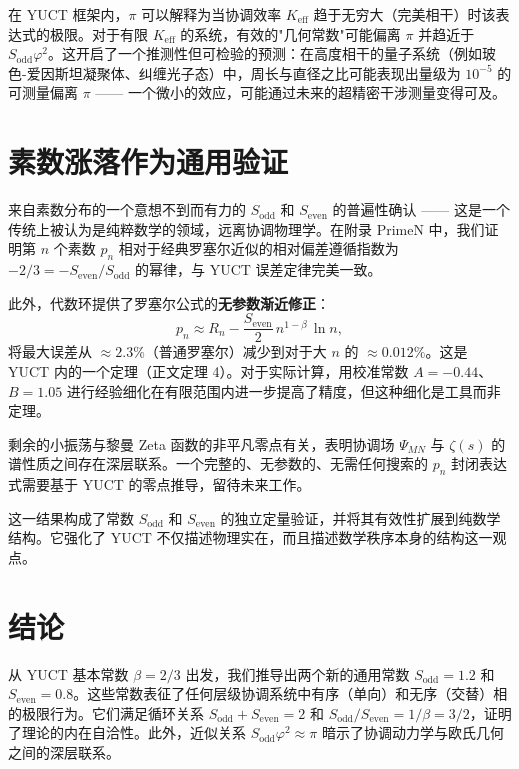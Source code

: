 \documentclass[12pt,a4paper]{article}
\begin{document}
	在 YUCT 框架内，\(\pi\) 可以解释为当协调效率 \(K_{\text{eff}}\) 趋于无穷大（完美相干）时该表达式的极限。对于有限 \(K_{\text{eff}}\) 的系统，有效的"几何常数"可能偏离 \(\pi\) 并趋近于 \(S_{\text{odd}}\varphi^2\)。这开启了一个推测性但可检验的预测：在高度相干的量子系统（例如玻色-爱因斯坦凝聚体、纠缠光子态）中，周长与直径之比可能表现出量级为 \(10^{-5}\) 的可测量偏离 \(\pi\) —— 一个微小的效应，可能通过未来的超精密干涉测量变得可及。
	
	\section{素数涨落作为通用验证}
	\label{sec:primes}
	
	来自素数分布的一个意想不到而有力的 \(S_{\mathrm{odd}}\) 和 \(S_{\mathrm{even}}\) 的普遍性确认 —— 这是一个传统上被认为是纯粹数学的领域，远离协调物理学。在附录 PrimeN 中，我们证明第 \(n\) 个素数 \(p_n\) 相对于经典罗塞尔近似的相对偏差遵循指数为 \(-2/3 = -S_{\mathrm{even}}/S_{\mathrm{odd}}\) 的幂律，与 YUCT 误差定律完美一致。
	
	此外，代数环提供了罗塞尔公式的\textbf{无参数渐近修正}：
	\[
	p_n \approx R_n - \frac{S_{\mathrm{even}}}{2}\, n^{1-\beta}\,\ln n,
	\]
	将最大误差从 \(\approx 2.3\%\)（普通罗塞尔）减少到对于大 \(n\) 的 \(\approx 0.012\%\)。这是 YUCT 内的一个定理（正文定理 4）。对于实际计算，用校准常数 \(A=-0.44\)、\(B=1.05\) 进行经验细化在有限范围内进一步提高了精度，但这种细化是工具而非定理。
	
	剩余的小振荡与黎曼 Zeta 函数的非平凡零点有关，表明协调场 \(\Psi_{MN}\) 与 \(\zeta(s)\) 的谱性质之间存在深层联系。一个完整的、无参数的、无需任何搜索的 \(p_n\) 封闭表达式需要基于 YUCT 的零点推导，留待未来工作。
	
	这一结果构成了常数 \(S_{\mathrm{odd}}\) 和 \(S_{\mathrm{even}}\) 的独立定量验证，并将其有效性扩展到纯数学结构。它强化了 YUCT 不仅描述物理实在，而且描述数学秩序本身的结构这一观点。
	
	\section{结论}
	从 YUCT 基本常数 \(\beta = 2/3\) 出发，我们推导出两个新的通用常数 \(S_{\text{odd}} = 1.2\) 和 \(S_{\text{even}} = 0.8\)。这些常数表征了任何层级协调系统中有序（单向）和无序（交替）相的极限行为。它们满足循环关系 \(S_{\text{odd}}+S_{\text{even}}=2\) 和 \(S_{\text{odd}}/S_{\text{even}} = 1/\beta = 3/2\)，证明了理论的内在自洽性。此外，近似关系 \(S_{\text{odd}}\varphi^2 \approx \pi\) 暗示了协调动力学与欧氏几何之间的深层联系。
	
\end{document}
